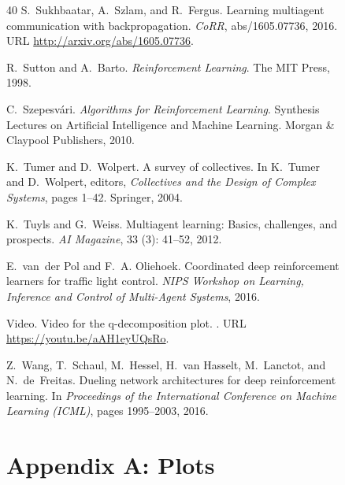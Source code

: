 \documentclass{article}
\begin{document}
\begin{figure}
\begin{thebibliography}{40}
S.~Sukhbaatar, A.~Szlam, and R.~Fergus.
\newblock Learning multiagent communication with backpropagation.
\newblock \emph{CoRR}, abs/1605.07736, 2016.
\newblock URL \url{http://arxiv.org/abs/1605.07736}.

R.~Sutton and A.~Barto.
\newblock \emph{Reinforcement Learning}.
\newblock The MIT Press, 1998.

C.~Szepesv{\'{a}}ri.
\newblock \emph{Algorithms for Reinforcement Learning}.
\newblock Synthesis Lectures on Artificial Intelligence and Machine Learning.
  Morgan {\&} Claypool Publishers, 2010.

K.~Tumer and D.~Wolpert.
\newblock A survey of collectives.
\newblock In K.~Tumer and D.~Wolpert, editors, \emph{Collectives and the Design
  of Complex Systems}, pages 1--42. Springer, 2004.

K.~Tuyls and G.~Weiss.
\newblock Multiagent learning: Basics, challenges, and prospects.
\newblock \emph{{AI} Magazine}, 33 (3): 41--52, 2012.

E.~van~der Pol and F.~A. Oliehoek.
\newblock Coordinated deep reinforcement learners for traffic light control.
\newblock \emph{NIPS Workshop on Learning, Inference and Control of Multi-Agent
  Systems}, 2016.

{Video}.
\newblock Video for the q-decomposition plot.
.
\newblock URL \url{https://youtu.be/aAH1eyUQsRo}.

Z.~Wang, T.~Schaul, M.~Hessel, H.~van Hasselt, M.~Lanctot, and N.~de~Freitas.
\newblock Dueling network architectures for deep reinforcement learning.
\newblock In \emph{Proceedings of the International Conference on Machine
  Learning (ICML)}, pages 1995--2003, 2016.

\end{thebibliography}

\newpage


\section*{Appendix A: Plots}



\end{figure}
\end{document}
